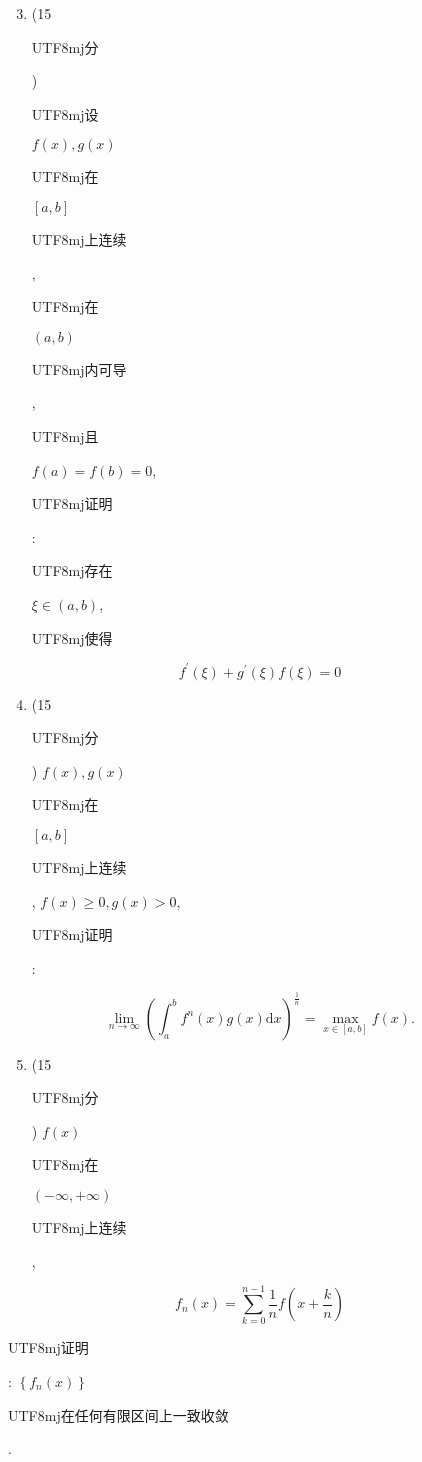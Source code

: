 \documentclass[10pt]{article}
\begin{document}
\begin{enumerate}
  \setcounter{enumi}{2}
  \item (15 \begin{CJK}{UTF8}{mj}分\end{CJK}) \begin{CJK}{UTF8}{mj}设\end{CJK} $f(x), g(x)$ \begin{CJK}{UTF8}{mj}在\end{CJK} $[a, b]$ \begin{CJK}{UTF8}{mj}上连续\end{CJK}, \begin{CJK}{UTF8}{mj}在\end{CJK} $(a, b)$ \begin{CJK}{UTF8}{mj}内可导\end{CJK}, \begin{CJK}{UTF8}{mj}且\end{CJK} $f(a)=f(b)=0$, \begin{CJK}{UTF8}{mj}证明\end{CJK}: \begin{CJK}{UTF8}{mj}存在\end{CJK} $\xi \in(a, b)$, \begin{CJK}{UTF8}{mj}使得\end{CJK}
\end{enumerate}
$$
f^{\prime}(\xi)+g^{\prime}(\xi) f(\xi)=0
$$

\begin{enumerate}
  \setcounter{enumi}{3}
  \item (15 \begin{CJK}{UTF8}{mj}分\end{CJK}) $f(x), g(x)$ \begin{CJK}{UTF8}{mj}在\end{CJK} $[a, b]$ \begin{CJK}{UTF8}{mj}上连续\end{CJK}, $f(x) \geq 0, g(x)>0$, \begin{CJK}{UTF8}{mj}证明\end{CJK}:
\end{enumerate}
$$
\lim _{n \rightarrow \infty}\left(\int_{a}^{b} f^{n}(x) g(x) \mathrm{d} x\right)^{\frac{1}{n}}=\max _{x \in[a, b]} f(x) .
$$

\begin{enumerate}
  \setcounter{enumi}{4}
  \item (15 \begin{CJK}{UTF8}{mj}分\end{CJK}) $f(x)$ \begin{CJK}{UTF8}{mj}在\end{CJK} $(-\infty,+\infty)$ \begin{CJK}{UTF8}{mj}上连续\end{CJK},
\end{enumerate}
$$
f_{n}(x)=\sum_{k=0}^{n-1} \frac{1}{n} f\left(x+\frac{k}{n}\right)
$$
\begin{CJK}{UTF8}{mj}证明\end{CJK}: $\left\{f_{n}(x)\right\}$ \begin{CJK}{UTF8}{mj}在任何有限区间上一致收敛\end{CJK}.
\end{document}
